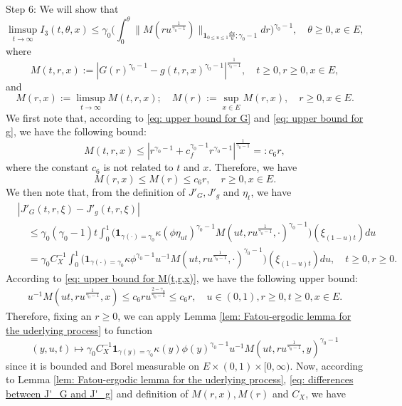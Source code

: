 \documentclass[12pt, a4paper]{amsart}
\theoremstyle{definition}
\numberwithin{equation}{section}
\begin{document}
	Step 6: We will show that
\[
	\limsup_{t\to \infty} I_3(t,\theta,x) 
	\leq \gamma_0 \Big(  \int_0^\theta  \| M(r u^{\frac{1}{\gamma_0 - 1}}) \|_{\mathbf 1_{0\leq u\leq 1}\frac{du}{u};\gamma_0 - 1}  dr\Big)^{\gamma_0 - 1}, 
	\quad \theta \geq 0, x\in E,
\]
	where
\[
	M(t,r,x)
	:= |G(r)^{\gamma_0 - 1} - g(t,r,x)^{\gamma_0 - 1}|^{\frac{1}{\gamma_0 - 1}},
	\quad t\geq 0, r\geq 0, x\in E,
\]
	and
\[
	M(r,x)
	:= \limsup_{t\to \infty} M(t,r,x);
	\quad M(r):= \sup_{x\in E} M(r,x),
	\quad r\geq 0, x\in E.
\]
	We first note that, according to \eqref{eq: upper bound for G} and \eqref{eq: upper bound for g}, we have the following bound:
\[\label{eq: upper bound for M(t,r,x)}
	M(t,r,x) 
	\leq |r^{\gamma_0 - 1} + c_f^{\gamma_0 - 1} r^{\gamma_0 - 1} | ^{\frac{1}{\gamma_0 - 1}}
	=: c_6 r,
\]
	where the constant $c_6$ is not related to $t$ and $x$. 
	Therefore, we have
\[
	M(r,x)
	\leq M(r)
	\leq c_6 r,
	\quad r\geq 0, x\in E.
\]	
	We then note that, from the definition of $J'_G, J'_g$ and $\eta_t$, we have
\[\label{eq: differences between J'_G and J'_g}\begin{split}
	&|J'_G(t,r,\xi) - J'_g(t,r,\xi)|
	\\&\quad \leq \gamma_0(\gamma_0 - 1) t \int_0^1 \big( \mathbf 1_{\gamma(\cdot) = \gamma_0} \kappa (\phi \eta_{ut})^{\gamma_0 - 1} M(ut,ru^{\frac{1}{\gamma_0 - 1}},\cdot)^{\gamma_0 - 1}\big)(\xi_{(1-u)t}) du
	\\&\quad = \gamma_0 C_X^{-1}\int_0^1 \big( \mathbf 1_{\gamma(\cdot) = \gamma_0} \kappa  \phi^{\gamma_0 - 1}  u^{-1} M(ut,ru^{\frac{1}{\gamma_0 - 1}},\cdot)^{\gamma_0 - 1}\big)(\xi_{(1-u)t}) du,
	\quad t\geq 0, r\geq 0.
\end{split}\]
	According to \eqref{eq: upper bound for M(t,r,x)}, we have the following upper bound:
\[\begin{split}
		u^{-1} M(ut,ru^{\frac{1}{\gamma_0 - 1}}, x) 
		\leq c_6 ru^{\frac{2-\gamma_0}{\gamma_0 - 1}}
		\leq c_6 r,
		\quad u\in (0,1), r\geq 0, t\geq 0, x\in E.
\end{split}\]
	Therefore, fixing an $r\geq 0$, we can apply Lemma \ref{lem: Fatou-ergodic lemma for the uderlying process} to function 
\[
	(y,u,t) 
	\mapsto \gamma_0 C_X^{-1}\mathbf 1_{\gamma(y) = \gamma_0} \kappa(y)  \phi(y)^{\gamma_0 - 1}  u^{-1} M(ut,ru^{\frac{1}{\gamma_0 - 1}},y)^{\gamma_0 - 1}
\]
	since it is bounded and Borel measurable on $E\times (0,1) \times [0,\infty)$.
	Now, according to Lemma \ref{lem: Fatou-ergodic lemma for the uderlying process},  \eqref{eq: differences between J'_G and J'_g} and definition of $M(r,x), M(r)$ and $C_X$, we have
\end{document}
